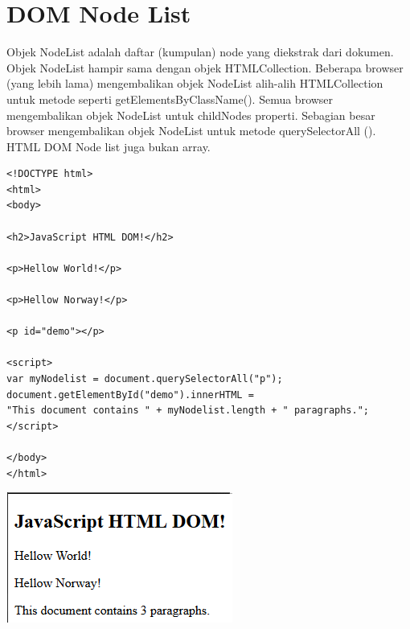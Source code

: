 \documentclass[a4paper,12pt]{article}
\begin{document}
\section*{DOM Node List}
Objek NodeList adalah daftar (kumpulan) node yang diekstrak dari dokumen. Objek NodeList hampir sama dengan objek HTMLCollection. Beberapa browser (yang lebih lama) mengembalikan objek NodeList alih-alih HTMLCollection untuk metode seperti getElementsByClassName(). Semua browser mengembalikan objek NodeList untuk childNodes properti. Sebagian besar browser mengembalikan objek NodeList untuk metode querySelectorAll (). HTML DOM Node list juga bukan array.
\begin{lstlisting}
<!DOCTYPE html>
<html>
<body>

<h2>JavaScript HTML DOM!</h2>

<p>Hellow World!</p>

<p>Hellow Norway!</p>

<p id="demo"></p>

<script>
var myNodelist = document.querySelectorAll("p");
document.getElementById("demo").innerHTML =
"This document contains " + myNodelist.length + " paragraphs.";
</script>

</body>
</html>
\end{lstlisting}
\begin{center}
    \includegraphics[scale=.7]{node.png} 
\end{center}
\end{document}
